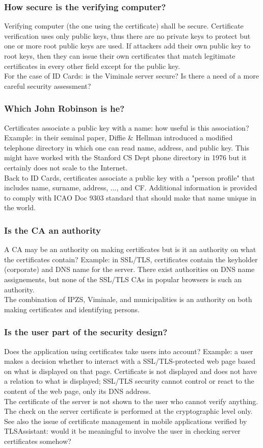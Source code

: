 \documentclass[a4paper, 10pt, titlepage]{article}
\begin{document}
\subsubsection*{How secure is the verifying computer?}
Verifying computer (the one using the certificate) shall be secure. Certificate verification uses only public keys, thus there are no private keys to protect but one or more root public keys are used. If attackers add their own public key to root keys, then they can issue their own certificates that match legitimate certificates in every other field except for the public key. \medskip\\
For the case of ID Cards: is the Viminale server secure? Is there a need of a more careful security assessment?
\subsubsection*{Which John Robinson is he?}
Certificates associate a public key with a name: how useful is this association? Example: in their seminal paper, %
Diffie \& Hellman introduced a modified telephone directory in which one can read name, address, and public key. This might have worked with the Stanford CS Dept phone directory in 1976 but it certainly does not scale to the Internet.\medskip\\
Back to ID Cards, certificates associate a public key with a "person profile" that includes name, surname, address, ..., and CF. Additional information is provided to comply with ICAO Doc 9303 standard that should make that name unique in the world.
\subsubsection*{Is the CA an authority}
A CA may be an authority on making certificates but is it an authority on what the certificates contain? Example: in SSL/TLS, certificates contain the keyholder (corporate) and DNS name for the server. There exist authorities on DNS name assignements, but none of the SSL/TLS CAs in popular browsers is such an authority. \medskip\\
The combination of IPZS, Viminale, and municipalities is an authority on both making certificates and identifying persons.
\subsubsection*{Is the user part of the security design?}
Does the application using certificates take users into account?
Example: a user makes a decision whether to interact with a SSL/TLS-protected web page based on what is displayed on that page. Certificate is not displayed and does not have a relation to what is displayed; SSL/TLS security cannot control or react to the content of the web page, only its DNS address.\medskip\\
The certificate of the server is not shown to the user who cannot verify anything. The check on the server certificate is performed at the cryptographic level only. See also the issue of certificate
management in mobile applications verified by TLSAssistant: would it be meaningful to involve the user in checking server certificates somehow?
\end{document}
